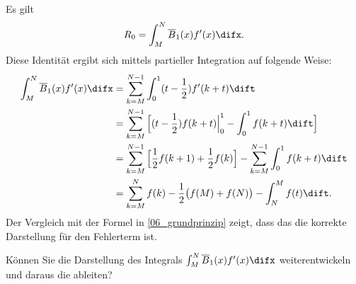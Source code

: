   \begin{antwort}
    
    Es gilt 
    \[
    R_0 = \int_M^N \overline{B}_1(x) f'(x) \difx.
    \]
    Diese Identität ergibt sich mittels partieller Integration 
    auf folgende Weise: 
    \begin{align*}
      \int_M^N \overline{B}_1(x) f'(x) \difx &=  
      \sum_{k=M}^{N-1} \int_0^{1} (t-\frac{1}{2} ) f'(k+t) \dift \\ 
      &=
      \sum_{k=M}^{N-1} \Big[ (t-\frac{1}{2}) f(k+t) \Big|_0^1 - 
      \int_0^1 f(k+t) \dift \Big] \\ 
      &=
      \sum_{k=M}^{N-1} \Big[ \frac{1}{2} f(k+1)+\frac{1}{2} f(k) 
      \Big]
      -
      \sum_{k=M}^{N-1} \int_0^1 f(k+t) \dift \\
      &=
      \sum_{k=M}^{N} f(k) -
      \frac{1}{2} \big( f(M)+f(N) \big) - \int_N^M f(t) \dift.
    \end{align*}
    Der Vergleich mit der Formel in \ref{06_grundprinzip} 
    zeigt, dass das die korrekte 
    Darstellung für den Fehlerterm ist.\AntEnd
  \end{antwort}

  \begin{frage}
    Können Sie die Darstellung des Integrals 
    $\int_M^N \overline{B}_1 (x) f'(x) \difx$ 
    weiterentwickeln und daraus die 
     ableiten?
  \end{frage}

